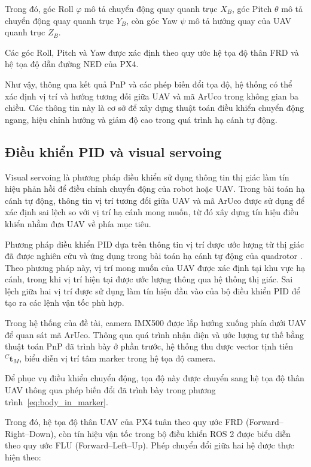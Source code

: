 Trong đó, góc Roll $\varphi$ mô tả chuyển
động quay quanh trục $X_B$, góc Pitch
$\theta$ mô tả chuyển động quay quanh
trục $Y_B$, còn góc Yaw $\psi$ mô tả
hướng quay của UAV quanh trục $Z_B$.

Các góc Roll, Pitch và Yaw được xác định
theo quy ước hệ tọa độ thân FRD và hệ
tọa độ dẫn đường NED của PX4.

Như vậy, thông qua kết quả PnP và các
phép biến đổi tọa độ, hệ thống có thể
xác định vị trí và hướng tương đối giữa
UAV và mã ArUco trong không gian ba chiều.
Các thông tin này là cơ sở để xây dựng
thuật toán điều khiển chuyển động ngang,
hiệu chỉnh hướng và giảm độ cao trong
quá trình hạ cánh tự động.

\subsection{Điều khiển PID và visual servoing}

Visual servoing là phương pháp điều khiển sử dụng thông tin
thị giác làm tín hiệu phản hồi để điều chỉnh chuyển động
của robot hoặc UAV. Trong bài toán hạ cánh tự động,
thông tin vị trí tương đối giữa UAV và mã ArUco được
sử dụng để xác định sai lệch so với vị trí hạ cánh
mong muốn, từ đó xây dựng tín hiệu điều khiển nhằm
đưa UAV về phía mục tiêu.

Phương pháp điều khiển PID dựa trên thông tin vị trí
được ước lượng từ thị giác đã được nghiên cứu và ứng
dụng trong bài toán hạ cánh tự động của quadrotor
\cite{sani2017aruco}. Theo phương pháp này, vị trí
mong muốn của UAV được xác định tại khu vực hạ cánh,
trong khi vị trí hiện tại được ước lượng thông qua
hệ thống thị giác. Sai lệch giữa hai vị trí được
sử dụng làm tín hiệu đầu vào của bộ điều khiển PID
để tạo ra các lệnh vận tốc phù hợp.

Trong hệ thống của đề tài, camera IMX500 được lắp
hướng xuống phía dưới UAV để quan sát mã ArUco.
Thông qua quá trình nhận diện và ước lượng tư thế
bằng thuật toán PnP đã trình bày ở phần trước,
hệ thống thu được vector tịnh tiến
${}^{C}\mathbf{t}_{M}$, biểu diễn vị trí tâm
marker trong hệ tọa độ camera.

Để phục vụ điều khiển chuyển động, tọa độ này
được chuyển sang hệ tọa độ thân UAV thông qua
phép biến đổi đã trình bày trong
phương trình~\eqref{eq:body_in_marker}.

Trong đó, hệ tọa độ thân UAV của PX4 tuân theo
quy ước FRD (Forward--Right--Down), còn tín hiệu
vận tốc trong bộ điều khiển ROS 2 được biểu diễn
theo quy ước FLU (Forward--Left--Up). Phép chuyển
đổi giữa hai hệ được thực hiện theo:

